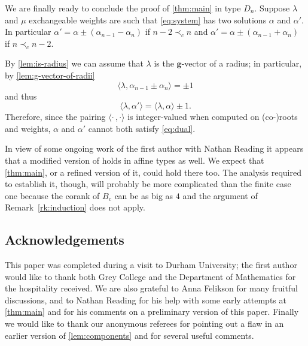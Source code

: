 \documentclass[pdftex]{sigma}
\numberwithin{equation}{section}
\numberwithin{figure}{section}
\newcommand{\bg}{\mathbf{g}}
\begin{document}
  We are finally ready to conclude the proof of \cref{thm:main} in type $D_n$.
  Suppose $\lambda$ and $\mu$ exchangeable weights are such that \cref{eq:system} has two solutions $\alpha$ and $\alpha'$.
  In particular $\alpha' = \alpha \pm (\alpha_{n-1}-\alpha_n)$ if $n-2 \prec_c n$ and $\alpha' = \alpha \pm (\alpha_{n-1}+\alpha_n)$ if $n \prec_c n-2$.

  By \cref{lem:is-radius} we can assume that $\lambda$ is the $\bg$-vector of a radius; in particular, by \cref{lem:g-vector-of-radii}
  \[
    \langle \lambda, \alpha_{n-1}\pm \alpha_n \rangle = \pm 1
  \]
  and thus
  \[
    \langle \lambda, \alpha' \rangle =
    \langle \lambda, \alpha \rangle \pm 1.
  \]
  Therefore, since the pairing $\langle\cdot\,,\cdot\rangle$ is integer-valued when computed on (co-)roots and weights, $\alpha$ and $\alpha'$ cannot both satisfy \cref{eq:dual}.

  \begin{Remark}
    In view of some ongoing work of the first author with Nathan Reading it appears that a modified version of \cite[Propositions 5.1 and 5.2]{Ste13} holds in affine types as well.
    We expect that \cref{thm:main}, or a refined version of it, could hold there too.
    The analysis required to establish it, though, will probably be more complicated than the finite case one because the corank of $B_c$ can be as big as $4$ and the argument of Remark~\ref{rk:induction} does not apply.
  \end{Remark}

\subsection*{Acknowledgements}
  This paper was completed during a visit to Durham University; the first author would like to thank both Grey College and the Department of Mathematics for the hospitality received.
  We are also grateful to Anna Felikson for many fruitful discussions, and to Nathan Reading for his help with some early attempts at \cref{thm:main} and for his comments on a preliminary version of this paper.
  Finally we would like to thank our anonymous referees for pointing out a flaw in an earlier version of \cref{lem:components} and for several useful comments.



\end{document}
